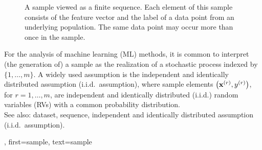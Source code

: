 {{{\begin{figure}
\begin{center}
 		\end{center}
 		\caption{A sample viewed as a finite sequence. 
		         Each element of this sample consists of the feature vector 
				 and the label of a data point from an underlying population.
				The same data point may occur more than once in the sample. 
 			\label{fig:sample-sequence_dict}}
 	\end{figure} 	
 	For the analysis of machine learning (ML) methods, it is common to interpret (the generation of) a 
	sample as the realization of a stochastic process indexed by $\{1,\ldots,m\}$. 
	A widely used assumption is the independent and identically distributed assumption (i.i.d.\ assumption), where sample elements 
	$\left( {\bf x}^{(r)},y^{(r)} \right)$, 
	for $r=1,\ldots,m$, are independent and identically distributed (i.i.d.) random variables (RVs) with a common probability distribution.  \\
 See also: dataset, sequence, independent and identically distributed assumption (i.i.d.\ assumption).},
 first={sample},
 text={sample}
}



}
